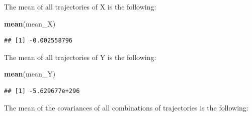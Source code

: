\documentclass[]{article}
\newenvironment{Shaded}{\begin{snugshade}}{\end{snugshade}}
\newcommand{\ControlFlowTok}[1]{\textcolor[rgb]{0.13,0.29,0.53}{\textbf{#1}}}
\newcommand{\DecValTok}[1]{\textcolor[rgb]{0.00,0.00,0.81}{#1}}
\newcommand{\KeywordTok}[1]{\textcolor[rgb]{0.13,0.29,0.53}{\textbf{#1}}}
\newcommand{\NormalTok}[1]{#1}
\newcommand{\OperatorTok}[1]{\textcolor[rgb]{0.81,0.36,0.00}{\textbf{#1}}}
\newcommand{\StringTok}[1]{\textcolor[rgb]{0.31,0.60,0.02}{#1}}
\begin{document}
\begin{Shaded}
\end{Shaded}

The mean of all trajectories of X is the following:

\begin{Shaded}
\begin{Highlighting}[]
\KeywordTok{mean}\NormalTok{(mean_X)}
\end{Highlighting}
\end{Shaded}

\begin{verbatim}
## [1] -0.002558796
\end{verbatim}

The mean of all trajectories of Y is the following:

\begin{Shaded}
\begin{Highlighting}[]
\KeywordTok{mean}\NormalTok{(mean_Y)}
\end{Highlighting}
\end{Shaded}

\begin{verbatim}
## [1] -5.629677e+296
\end{verbatim}

The mean of the covariances of all combinations of trajectories is the
following:
\end{document}

